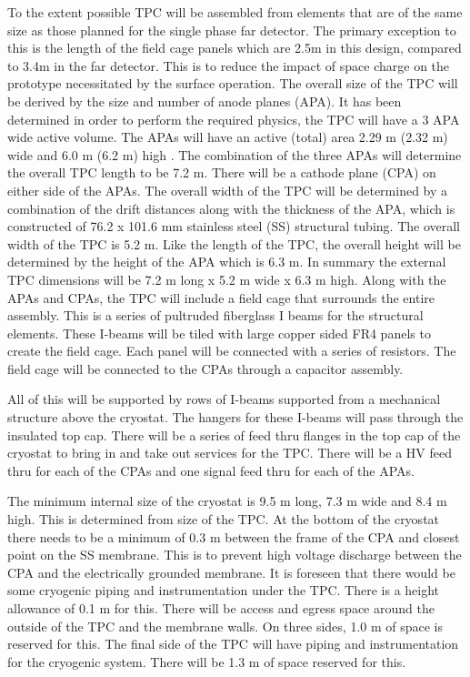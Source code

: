 To the extent possible TPC will be assembled from elements that are of the same size as those planned for the single phase far detector.  The primary exception to this is the length of the field cage panels which are 2.5m in this design, compared to 3.4m in the far detector. This is to reduce the impact of space charge on the prototype necessitated by the surface operation. The overall size of the TPC will be derived by the size and number of anode planes (APA).  It has been determined in order to perform the required physics, the TPC will have a 3 APA wide active volume.  The APAs will have an active (total) area 2.29 m (2.32 m) wide and 6.0 m (6.2 m) high . The combination of the three APAs will determine the overall TPC length to be 7.2 m. There will be a cathode plane (CPA) on either side of the APAs.  The overall width of the TPC will be determined by a combination of the drift distances along with the thickness of the APA, which is constructed of 76.2 x 101.6 mm stainless steel (SS) structural tubing.  The overall width of the TPC is 5.2 m.  Like the length of the TPC, the overall height will be determined by the height of the APA which is 6.3 m.  In summary the external TPC dimensions will be 7.2 m long x 5.2 m wide x 6.3 m high. Along with the APAs and CPAs, the TPC will include a field cage that surrounds the entire assembly.  This is a series of pultruded fiberglass I beams for the structural elements.  These I-beams will be tiled with large copper sided FR4 panels to create the field cage.  Each panel will be connected with a series of resistors.  The field cage will be connected to the CPAs through a capacitor assembly.

All of this will be supported by rows of I-beams supported from a mechanical structure above the cryostat.  The hangers for these I-beams will pass through the insulated top cap.  There will be a series of feed thru flanges in the top cap of the cryostat to bring in and take out services for the TPC.  There will be a HV feed thru for each of the CPAs and one signal feed thru for each of the APAs.


The minimum internal size of the cryostat is 9.5 m long, 7.3 m wide and 8.4 m high.  This is determined from size of the TPC.  At the bottom of the 
cryostat there needs to be a minimum of 0.3 m between the frame of the CPA and closest point on the SS membrane.  This is to prevent high voltage discharge between the CPA and the electrically grounded membrane. It is foreseen that there would be some cryogenic piping and instrumentation under the TPC.  There is a height allowance of 0.1 m for this.  There will be access and egress space around the outside of the TPC and the membrane walls.  On three sides, 1.0 m of space is reserved for this.  The final side of the TPC will have piping and instrumentation for the cryogenic system.  There will be 1.3 m of space reserved for this.  

